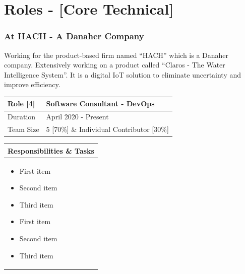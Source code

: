 \documentclass[11pt, a4paper]{article}
\begin{document}
\section*{Roles - [Core Technical]}
\vspace{-1.5mm}
\subsubsection*{\faBuilding\hspace{0.1pt} At HACH - A Danaher Company}
Working for the product-based firm named “HACH” which is a Danaher company.  Extensively working on a product called “Claros - The Water Intelligence System”. It is a digital IoT solution to eliminate uncertainty and improve efficiency. \\

\noindent\begin{tabular}{|p{1.5in}|p{5in}|}
\hline
\rowcolor{black!20} Role [4] & Software Consultant - DevOps\\
\hline
Duration & April 2020 - Present\\
\hline
Team Size & 5 [70\%] \& Individual Contributor [30\%]\\
\hline
\end{tabular}
\newline
\vspace*{1mm}
\newline
\begin{tabular}{|p{6.67in}|}
\hline
\rowcolor{black!5} Responsibilities \& Tasks\\
\hline
\begin{itemize}[noitemsep, nolistsep]
\item First item
\item Second item
\item Third item
\item First item
\item Second item
\item Third item
\end{itemize} \\
\hline
\end{tabular}
\pagebreak
\end{document}

